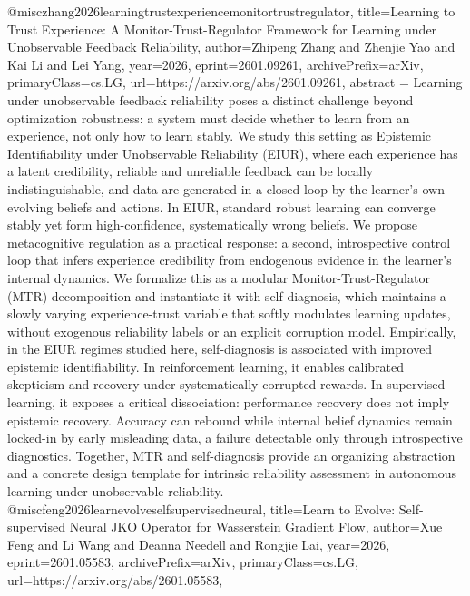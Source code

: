 {}@misc{zhang2026learningtrustexperiencemonitortrustregulator,
      title={Learning to Trust Experience: A Monitor-Trust-Regulator Framework for Learning under Unobservable Feedback Reliability}, 
      author={Zhipeng Zhang and Zhenjie Yao and Kai Li and Lei Yang},
      year={2026},
      eprint={2601.09261},
      archivePrefix={arXiv},
      primaryClass={cs.LG},
      url={https://arxiv.org/abs/2601.09261},
      abstract = {Learning under unobservable feedback reliability poses a distinct challenge beyond optimization robustness: a system must decide whether to learn from an experience, not only how to learn stably. We study this setting as Epistemic Identifiability under Unobservable Reliability (EIUR), where each experience has a latent credibility, reliable and unreliable feedback can be locally indistinguishable, and data are generated in a closed loop by the learner's own evolving beliefs and actions. In EIUR, standard robust learning can converge stably yet form high-confidence, systematically wrong beliefs.   We propose metacognitive regulation as a practical response: a second, introspective control loop that infers experience credibility from endogenous evidence in the learner's internal dynamics. We formalize this as a modular Monitor-Trust-Regulator (MTR) decomposition and instantiate it with self-diagnosis, which maintains a slowly varying experience-trust variable that softly modulates learning updates, without exogenous reliability labels or an explicit corruption model.   Empirically, in the EIUR regimes studied here, self-diagnosis is associated with improved epistemic identifiability. In reinforcement learning, it enables calibrated skepticism and recovery under systematically corrupted rewards. In supervised learning, it exposes a critical dissociation: performance recovery does not imply epistemic recovery. Accuracy can rebound while internal belief dynamics remain locked-in by early misleading data, a failure detectable only through introspective diagnostics. Together, MTR and self-diagnosis provide an organizing abstraction and a concrete design template for intrinsic reliability assessment in autonomous learning under unobservable reliability.}
}@misc{feng2026learnevolveselfsupervisedneural,
      title={Learn to Evolve: Self-supervised Neural JKO Operator for Wasserstein Gradient Flow}, 
      author={Xue Feng and Li Wang and Deanna Needell and Rongjie Lai},
      year={2026},
      eprint={2601.05583},
      archivePrefix={arXiv},
      primaryClass={cs.LG},
      url={https://arxiv.org/abs/2601.05583},
}
